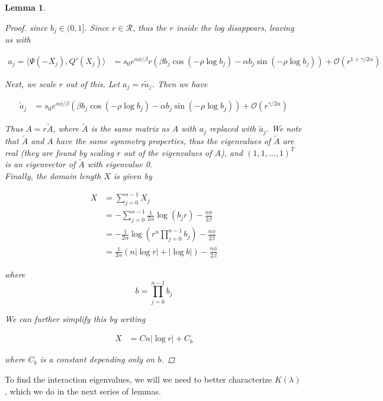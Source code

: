 \documentclass[12pt]{article}
\newtheorem{lemma}{Lemma}
\begin{document}
\begin{lemma}
\begin{proof}
since $b_j \in (0, 1]$. Since $r \in \mathcal{R}$, thus the $r$ inside the log disappears, leaving us with

\begin{align*}
a_j = \langle \Psi(-X_j), Q'(X_j) \rangle 
&= s_0 e^{\alpha \phi/\beta} r \left( \beta b_j \cos\left( -\rho \log b_j \right) - \alpha b_j \sin \left( -\rho \log b_j  \right) \right) + \mathcal{O}(r^{1+\gamma/2\alpha})
\end{align*}

Next, we scale $r$ out of this. Let $a_j = r \tilde{a}_j$. Then we have

\begin{align*}
\tilde{a}_j 
&= s_0 e^{\alpha \phi/\beta} \left( \beta b_j \cos\left( -\rho \log b_j \right) - \alpha b_j \sin \left( -\rho \log b_j  \right) \right) + \mathcal{O}(r^{\gamma/2\alpha})
\end{align*}

Thus $A = r \tilde{A}$, where $\tilde{A}$ is the same matrix as $A$ with $a_j$ replaced with $\tilde{a}_j$. We note that $\tilde{A}$ and $A$ have the same symmetry properties, thus the eigenvalues of $\tilde{A}$ are real (they are found by scaling $r$ out of the eigenvalues of $A$), and $(1,1,\dots,1)^T$ is an eigenvector of $\tilde{A}$ with eigenvalue 0. \\

Finally, the domain length $X$ is given by

\begin{align*}
X &= \sum_{j=0}^{n-1} X_j \\
&= -\sum_{j=0}^{n-1} \frac{1}{2\alpha}\log(b_j r) - \frac{n \phi}{2 \beta}\\
&= -\frac{1}{2\alpha} \log\left( r^n \prod_{j=0}^{n-1} b_j \right) - \frac{n \phi}{2 \beta} \\
&= \frac{1}{2\alpha} (n |\log r| + |\log b| ) - \frac{n \phi}{2 \beta}
\end{align*}

where 
\[
b = \prod_{j=0}^{n-1} b_j
\]

We can further simplify this by writing

\begin{align*}
X &= C n |\log r| + C_b
\end{align*}

where $C_b$ is a constant depending only on $b$.

\end{proof}
\end{lemma}

To find the interaction eigenvalues, we will we need to better characterize $K(\lambda)$, which we do in the next series of lemmas.
\end{document}
